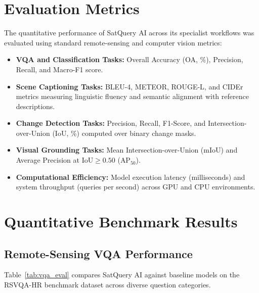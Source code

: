 \documentclass[12pt,a4paper]{report}
\begin{document}
\section{Evaluation Metrics}
The quantitative performance of SatQuery AI across its specialist workflows was evaluated using standard remote-sensing and computer vision metrics:
\begin{itemize}
    \item \textbf{VQA and Classification Tasks:} Overall Accuracy (OA, \%), Precision, Recall, and Macro-F1 score.
    \item \textbf{Scene Captioning Tasks:} BLEU-4, METEOR, ROUGE-L, and CIDEr metrics measuring linguistic fluency and semantic alignment with reference descriptions.
    \item \textbf{Change Detection Tasks:} Precision, Recall, F1-Score, and Intersection-over-Union (IoU, \%) computed over binary change masks.
    \item \textbf{Visual Grounding Tasks:} Mean Intersection-over-Union (mIoU) and Average Precision at $\text{IoU} \ge 0.50$ ($\text{AP}_{50}$).
    \item \textbf{Computational Efficiency:} Model execution latency (milliseconds) and system throughput (queries per second) across GPU and CPU environments.
\end{itemize}

\section{Quantitative Benchmark Results}

\subsection{Remote-Sensing VQA Performance}
Table~\ref{tab:vqa_eval} compares SatQuery AI against baseline models on the RSVQA-HR benchmark dataset across diverse question categories.

\begin{table}[htbp]
\centering
\caption{VQA Performance Comparison on RSVQA-HR Benchmark}\label{tab:vqa_eval}
\end{table}
\end{document}
